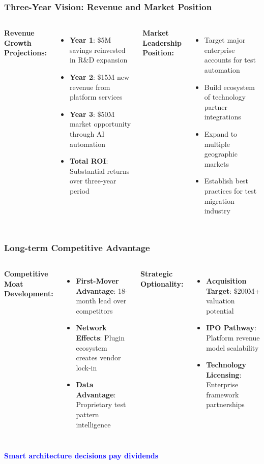 \begin{frame}
\frametitle{Three-Year Vision: Revenue and Market Position}
\begin{columns}
\textbf{Revenue Growth Projections:}
\begin{itemize}
    \item \textbf{Year 1}: \$5M savings reinvested in R\&D expansion
    \item \textbf{Year 2}: \$15M new revenue from platform services
    \item \textbf{Year 3}: \$50M market opportunity through AI automation
    \item \textbf{Total ROI}: Substantial returns over three-year period
\end{itemize}

\textbf{Market Leadership Position:}
\begin{itemize}
    \item Target major enterprise accounts for test automation
    \item Build ecosystem of technology partner integrations
    \item Expand to multiple geographic markets
    \item Establish best practices for test migration industry
\end{itemize}
\end{columns}
\end{frame}

\begin{frame}
\frametitle{Long-term Competitive Advantage}
\begin{columns}
\textbf{Competitive Moat Development:}
\begin{itemize}
    \item \textbf{First-Mover Advantage}: 18-month lead over competitors
    \item \textbf{Network Effects}: Plugin ecosystem creates vendor lock-in
    \item \textbf{Data Advantage}: Proprietary test pattern intelligence
\end{itemize}

\textbf{Strategic Optionality:}
\begin{itemize}
    \item \textbf{Acquisition Target}: \$200M+ valuation potential
    \item \textbf{IPO Pathway}: Platform revenue model scalability
    \item \textbf{Technology Licensing}: Enterprise framework partnerships
\end{itemize}
\end{columns}

\vspace{0.3cm}
\begin{center}
\textcolor{blue}{\textbf{Smart architecture decisions pay dividends}}
\end{center}
\end{frame}

